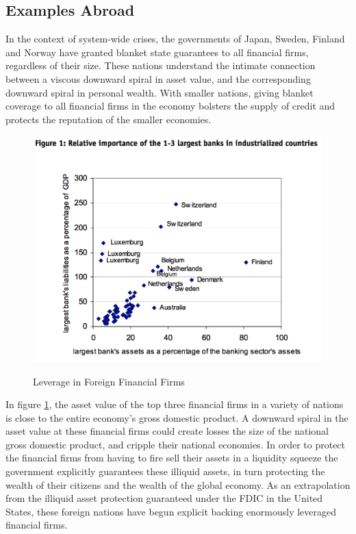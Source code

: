 

\subsection{Examples Abroad} 
In the context of system-wide crises, the governments of Japan, Sweden, Finland and Norway have granted blanket state guarantees to all financial firms, regardless of their size.\cite{Rime}  These nations understand the intimate connection between a viscous downward spiral in asset value, and the corresponding downward spiral in personal wealth.  With smaller nations, giving blanket coverage to all financial firms in the economy bolsters the supply of credit and protects the reputation of the smaller economies.\cite{Rime}

\begin{figure}[H]
\centering
\includegraphics[scale=.70]{figure/RimeForeigners.png}\\[-0.7cm]
\caption{Leverage in Foreign Financial Firms\label{fig:abroad}}
\end{figure}

In figure \ref{fig:abroad}, the asset value of the top three financial firms in a variety of nations is close to the entire economy's gross domestic product.  A downward spiral in the asset value at these financial firms could create losses the size of the national gross domestic product, and cripple their national economies.  In order to protect the financial firms from having to fire sell their assets in a liquidity squeeze the government explicitly guarantees these illiquid assets, in turn protecting the wealth of their citizens and the wealth of the global economy.  As an extrapolation from the illiquid asset protection guaranteed under the FDIC in the United States, these foreign nations have begun explicit backing enormously leveraged financial firms.

